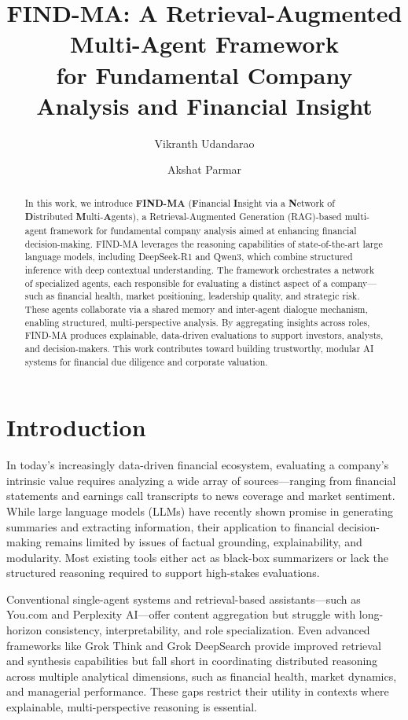 \documentclass[11pt]{article}
\title{FIND-MA: A Retrieval-Augmented Multi-Agent Framework\\
for Fundamental Company Analysis and Financial Insight}
\author[1]{Vikranth Udandarao}
\author[1]{Akshat Parmar}
\affil[1]{IIIT Delhi, India}
\affil[ ]{\texttt{\{vikranth22570, akshat22050\}@iiitd.ac.in}}
\date{} %
\newcommand{\findma}{\textsc{FIND-MA}}
\begin{document}
\maketitle

\begin{abstract}
In this work, we introduce \textbf{\findma{}} (\textbf{F}inancial \textbf{I}nsight via a \textbf{N}etwork of \textbf{D}istributed \textbf{M}ulti-\textbf{A}gents), a Retrieval-Augmented Generation (RAG)-based multi-agent framework for fundamental company analysis aimed at enhancing financial decision-making. \findma{} leverages the reasoning capabilities of state-of-the-art large language models, including DeepSeek-R1 and Qwen3, which combine structured inference with deep contextual understanding. The framework orchestrates a network of specialized agents, each responsible for evaluating a distinct aspect of a company—such as financial health, market positioning, leadership quality, and strategic risk. These agents collaborate via a shared memory and inter-agent dialogue mechanism, enabling structured, multi-perspective analysis. By aggregating insights across roles, \findma{} produces explainable, data-driven evaluations to support investors, analysts, and decision-makers. This work contributes toward building trustworthy, modular AI systems for financial due diligence and corporate valuation.
\end{abstract}


\section{Introduction}
\label{sec:intro}
In today’s increasingly data-driven financial ecosystem, evaluating a company’s intrinsic value requires analyzing a wide array of sources—ranging from financial statements and earnings call transcripts to news coverage and market sentiment. While large language models (LLMs) have recently shown promise in generating summaries and extracting information, their application to financial decision-making remains limited by issues of factual grounding, explainability, and modularity. Most existing tools either act as black-box summarizers or lack the structured reasoning required to support high-stakes evaluations.

Conventional single-agent systems and retrieval-based assistants—such as You.com and Perplexity AI—offer content aggregation but struggle with long-horizon consistency, interpretability, and role specialization. Even advanced frameworks like Grok Think and Grok DeepSearch provide improved retrieval and synthesis capabilities but fall short in coordinating distributed reasoning across multiple analytical dimensions, such as financial health, market dynamics, and managerial performance. These gaps restrict their utility in contexts where explainable, multi-perspective reasoning is essential.
\end{document}
